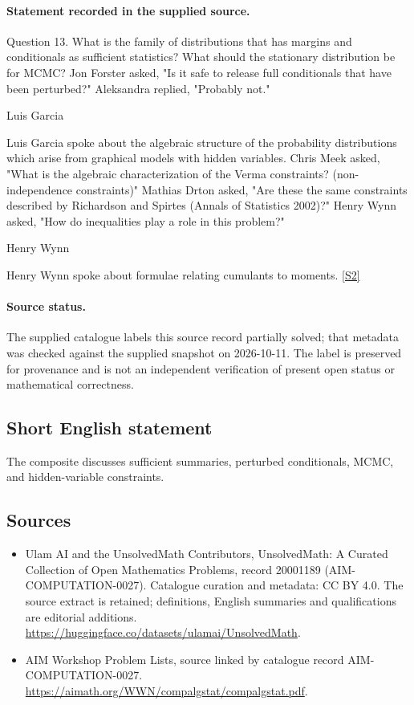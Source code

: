 \documentclass[11pt]{article}
\begin{document}
\paragraph{Statement recorded in the supplied source.}
Question 13. What is the family of distributions that has margins and conditionals as sufficient statistics? What should the stationary distribution be for MCMC? Jon Forster asked, "Is it safe to release full conditionals that have been perturbed?" Aleksandra replied, "Probably not."

Luis Garcia

Luis Garcia spoke about the algebraic structure of the probability distributions which arise from graphical models with hidden variables. Chris Meek asked, "What is the algebraic characterization of the Verma constraints? (non-independence constraints)" Mathias Drton asked, "Are these the same constraints described by Richardson and Spirtes (Annals of Statistics 2002)?" Henry Wynn asked, "How do inequalities play a role in this problem?"

Henry Wynn

Henry Wynn spoke about formulae relating cumulants to moments. \href{https://aimath.org/WWN/compalgstat/compalgstat.pdf}{[S2]}
\paragraph{Source status.}
The supplied catalogue labels this source record partially solved; that metadata was checked against the supplied snapshot on 2026-10-11. The label is preserved for provenance and is not an independent verification of present open status or mathematical correctness.
\subsection{Short English statement}
The composite discusses sufficient summaries, perturbed conditionals, MCMC, and hidden-variable constraints.
\subsection{Sources}
\begin{itemize}
\item[S1] Ulam AI and the UnsolvedMath Contributors, UnsolvedMath: A Curated Collection of Open Mathematics Problems, record 20001189 (AIM-COMPUTATION-0027). Catalogue curation and metadata: CC BY 4.0. The source extract is retained; definitions, English summaries and qualifications are editorial additions.
\url{https://huggingface.co/datasets/ulamai/UnsolvedMath}.
\item[S2] AIM Workshop Problem Lists, source linked by catalogue record AIM-COMPUTATION-0027.
\url{https://aimath.org/WWN/compalgstat/compalgstat.pdf}.
\end{itemize}
\end{document}
